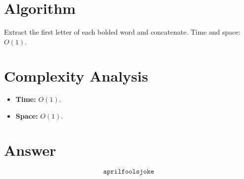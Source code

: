 \documentclass[11pt]{article}
\begin{document}
\section{Algorithm}

Extract the first letter of each bolded word and concatenate. Time and space: $O(1)$.

\section{Complexity Analysis}

\begin{itemize}
\item \textbf{Time:} $O(1)$.
\item \textbf{Space:} $O(1)$.
\end{itemize}

\section{Answer}

\[
\boxed{\texttt{aprilfoolsjoke}}
\]
\end{document}
